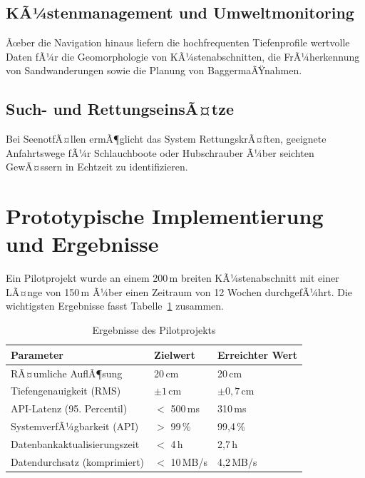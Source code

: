 ﻿\documentclass[a4paper,12pt]{article}
\theoremstyle{definition}
\begin{document}
\subsection{KÃ¼stenmanagement und Umweltmonitoring}

Ãœber die Navigation hinaus liefern die hochfrequenten Tiefenprofile wertvolle Daten fÃ¼r
die Geomorphologie von KÃ¼stenabschnitten, die FrÃ¼herkennung von Sandwanderungen
sowie die Planung von BaggermaÃŸnahmen.

\subsection{Such- und RettungseinsÃ¤tze}

Bei SeenotfÃ¤llen ermÃ¶glicht das System RettungskrÃ¤ften, geeignete Anfahrtswege fÃ¼r
Schlauchboote oder Hubschrauber Ã¼ber seichten GewÃ¤ssern in Echtzeit zu identifizieren.

\section{Prototypische Implementierung und Ergebnisse}

Ein Pilotprojekt wurde an einem 200\,m breiten KÃ¼stenabschnitt mit einer LÃ¤nge von
150\,m Ã¼ber einen Zeitraum von 12 Wochen durchgefÃ¼hrt. Die wichtigsten Ergebnisse
fasst Tabelle~\ref{tab:ergebnisse} zusammen.

\begin{table}[H]
\centering
\caption{Ergebnisse des Pilotprojekts}
\label{tab:ergebnisse}
\renewcommand{\arraystretch}{1.3}
\begin{tabular}{@{}lll@{}}
\toprule
\textbf{Parameter} & \textbf{Zielwert} & \textbf{Erreichter Wert} \\
\midrule
RÃ¤umliche AuflÃ¶sung & 20\,cm & 20\,cm \\
Tiefengenauigkeit (RMS) & $\pm 1\,\text{cm}$ & $\pm 0{,}7\,\text{cm}$ \\
API-Latenz (95. Percentil) & $<$ 500\,ms & 310\,ms \\
SystemverfÃ¼gbarkeit (API) & $>$ 99\,\% & 99{,}4\,\% \\
Datenbankaktualisierungszeit & $<$ 4\,h & 2{,}7\,h \\
Datendurchsatz (komprimiert) & $<$ 10\,MB/s & 4{,}2\,MB/s \\
\bottomrule
\end{tabular}
\end{table}
\end{document}
